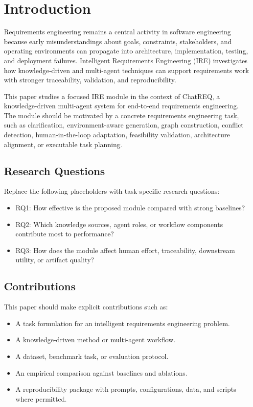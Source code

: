 \section{Introduction}

Requirements engineering remains a central activity in software engineering because early misunderstandings about goals, constraints, stakeholders, and operating environments can propagate into architecture, implementation, testing, and deployment failures. Intelligent Requirements Engineering (IRE) investigates how knowledge-driven and multi-agent techniques can support requirements work with stronger traceability, validation, and reproducibility.

This paper studies a focused IRE module in the context of ChatREQ, a knowledge-driven multi-agent system for end-to-end requirements engineering. The module should be motivated by a concrete requirements engineering task, such as clarification, environment-aware generation, graph construction, conflict detection, human-in-the-loop adaptation, feasibility validation, architecture alignment, or executable task planning.

\subsection{Research Questions}

Replace the following placeholders with task-specific research questions:

\begin{itemize}
  \item RQ1: How effective is the proposed module compared with strong baselines?
  \item RQ2: Which knowledge sources, agent roles, or workflow components contribute most to performance?
  \item RQ3: How does the module affect human effort, traceability, downstream utility, or artifact quality?
\end{itemize}

\subsection{Contributions}

This paper should make explicit contributions such as:

\begin{itemize}
  \item A task formulation for an intelligent requirements engineering problem.
  \item A knowledge-driven method or multi-agent workflow.
  \item A dataset, benchmark task, or evaluation protocol.
  \item An empirical comparison against baselines and ablations.
  \item A reproducibility package with prompts, configurations, data, and scripts where permitted.
\end{itemize}

